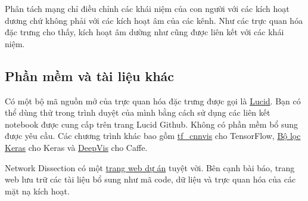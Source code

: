 Phân tách mạng chỉ điều chỉnh các khái niệm của con người với các kích hoạt dương chứ không phải với các kích hoạt âm của các kênh. Như các trực quan hóa đặc trưng  cho thấy, kích hoạt âm dường như cũng được liên kết với các khái niệm.

\subsection{Phần mềm và tài liệu khác}
Có một bộ mã nguồn mở của trực quan hóa đặc trưng được gọi là \href{https://github.com/tensorflow/lucid}{Lucid}. Bạn có thể dùng thử trong trình duyệt của mình bằng cách sử dụng các liên kết notebook được cung cấp trên trang Lucid Github. Không có phần mềm bổ sung được yêu cầu. Các chương trình khác bao gồm \href{https://github.com/InFoCusp/tf_cnnvis}{tf\_cnnvis} cho TensorFlow, \href{https://github.com/jacobgil/keras-filter-visualization}{Bộ lọc Keras} cho Keras và \href{https://github.com/yosinski/deep-visualization-toolbox}{DeepVis} cho Caffe.

Network Dissection có một \href{http://netdissect.csail.mit.edu/}{trang web dự án} tuyệt vời. Bên cạnh bài báo, trang web lưu trữ các tài liệu bổ sung như mã code, dữ liệu và trực quan hóa của các mặt nạ kích hoạt.

